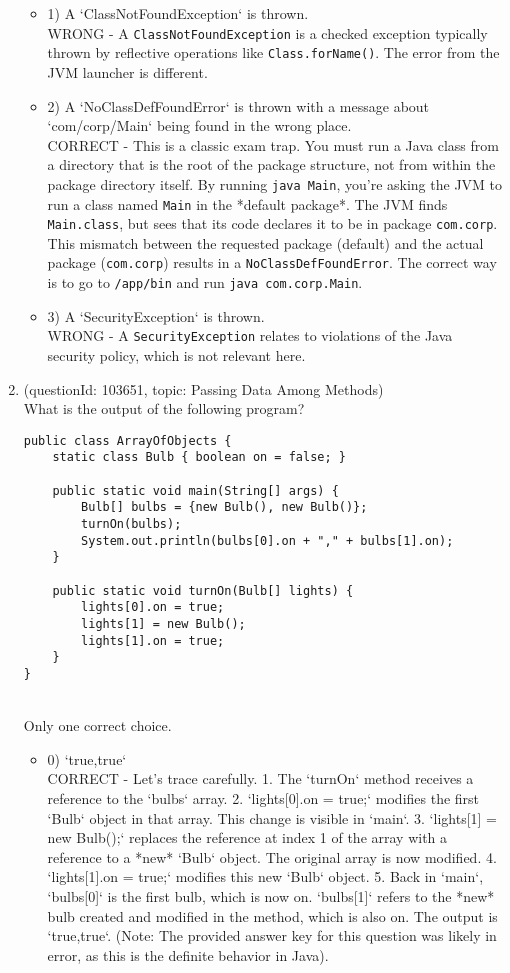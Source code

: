 \documentclass[12pt]{article}
\begin{document}
\begin{enumerate}[label=(\arabic*)]
\begin{itemize}
\item 1) A `ClassNotFoundException` is thrown.
 \\ 
WRONG - A \verb|ClassNotFoundException| is a checked exception typically thrown by reflective operations like \verb|Class.forName()|. The error from the JVM launcher is different.

\item 2) A `NoClassDefFoundError` is thrown with a message about `com/corp/Main` being found in the wrong place.
 \\ 
CORRECT - This is a classic exam trap. You must run a Java class from a directory that is the root of the package structure, not from within the package directory itself. By running \verb|java Main|, you're asking the JVM to run a class named \verb|Main| in the *default package*. The JVM finds \verb|Main.class|, but sees that its code declares it to be in package \verb|com.corp|. This mismatch between the requested package (default) and the actual package (\verb|com.corp|) results in a \verb|NoClassDefFoundError|. The correct way is to go to \verb|/app/bin| and run \verb|java com.corp.Main|.

\item 3) A `SecurityException` is thrown.
 \\ 
WRONG - A \verb|SecurityException| relates to violations of the Java security policy, which is not relevant here.

\end{itemize}
\item (questionId: 103651, topic: Passing Data Among Methods) \\ 
What is the output of the following program?
\begin{verbatim}
public class ArrayOfObjects {
    static class Bulb { boolean on = false; }

    public static void main(String[] args) {
        Bulb[] bulbs = {new Bulb(), new Bulb()};
        turnOn(bulbs);
        System.out.println(bulbs[0].on + "," + bulbs[1].on);
    }

    public static void turnOn(Bulb[] lights) {
        lights[0].on = true;
        lights[1] = new Bulb();
        lights[1].on = true;
    }
}
\end{verbatim}
\\ \noindent Only one correct choice. 
\begin{itemize}
\item 0) `true,true`
 \\ 
CORRECT - Let's trace carefully. 1. The `turnOn` method receives a reference to the `bulbs` array. 2. `lights[0].on = true;` modifies the first `Bulb` object in that array. This change is visible in `main`. 3. `lights[1] = new Bulb();` replaces the reference at index 1 of the array with a reference to a *new* `Bulb` object. The original array is now modified. 4. `lights[1].on = true;` modifies this new `Bulb` object. 5. Back in `main`, `bulbs[0]` is the first bulb, which is now on. `bulbs[1]` refers to the *new* bulb created and modified in the method, which is also on. The output is `true,true`. (Note: The provided answer key for this question was likely in error, as this is the definite behavior in Java).


\end{itemize}
\end{enumerate}
\end{document}
